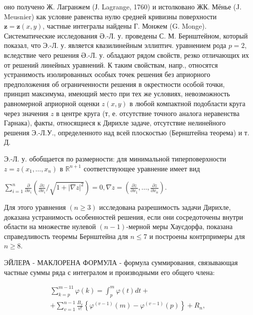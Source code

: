 \documentclass[10pt]{article}
\begin{document}
оно получено Ж. Лагранжем (Ј. Lagrange, 1760) и истолковано ЖК. Мёнье (J. Meusnier) как условие равенства нулю средней кривизны поверхности $\boldsymbol{z}=\boldsymbol{z}(x, y)$, частные интегралы найдены Г. Монжем (G. Monge). Систематические исследования Ә.-Л. у. проведены С. М. Бернштейном, который показал, что Э.-Л. у. является квазилинейным эллиптич. уравнением рода $p=2$, вследствие чего решения Ә.-Л. у. обладают рядом свойств, резко отличающих их от решений линейных уравнений. К таким свойствам, напр., относятся устранимость изолированных особых точек решения без априорного предположения об ограниченности решения в окрестности особой точки, принцип максимума, имеющий место при тех же условиях, невозможность равномерной априорной оценки $z(x, y)$ в любой компактной подобласти круга через значения $z$ в центре круга (т, е. отсутствие точного аналога неравенства Гарнака), факты, относящиеся к Дирихле задаче, отсутствие нелинейного решения Э.-Л.У., определенното над всей плоскостью (Бернштейна теорема) и т. Д.



Э.-Л. у. обобщается по размерности: для минимальной типерповерхности $z=z\left(x_{1}, \ldots, x_{n}\right)$ в $\mathbb{R}^{n+1}$ соответствующее уравнение имеет вид



$\sum_{i=1}^{n} \frac{\partial}{\partial x_{i}}\left(\frac{\partial z}{\partial x_{i}} / \sqrt{1+|\nabla z|^{2}}\right)=0, \nabla z=\left(\frac{\partial z}{\partial x_{1}}, \ldots, \frac{\partial z}{\partial x_{n}}\right)$.



Для этого уравнения $(n \geqslant 3)$ исследована разрешимость задачи Дирихле, доказана устранимость особенностей решения, если они сосредоточены внутри области на множестве нулевой $(n-1)$-мерной меры Хаусдорфа, показана справедливость теоремы Бернштейна для $n \leqslant 7$ и построены контрпримеры для $n \geqslant 8$.



ЭЙЛЕРА - МАКЛОРЕНА ФОРМУЛА - формула суммирования, связывающая частные суммы ряда с интегралом и производными его общего члена:



\[

\begin{gathered}

\sum_{k=p}^{m-11} \varphi(k)=\int_{p}^{m} \varphi(t) d t+ \\

+\sum_{v=1}^{n-1} \frac{B_{v}}{v !}\left\{\varphi^{(v-1)}(m)-\varphi^{(v-1)}(p)\right\}+R_{n},

\end{gathered}

\]
\end{document}
